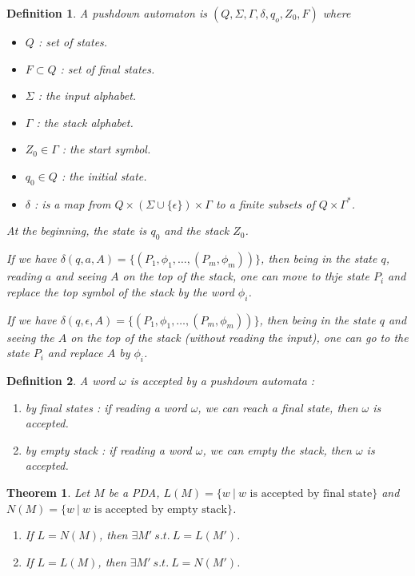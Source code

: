 \documentclass[a4paper,11pt]{article}
\newtheorem{mydef}{Definition}
\newtheorem{thm}{Theorem}[section]
\begin{document}
\begin{mydef}
  A pushdown automaton is $(Q,\Sigma,\Gamma,\delta,q_o,Z_0,F)$ where
  \begin{itemize}
  \item $Q$ : set of states.
  \item $F \subset Q$ : set of final states.
  \item $\Sigma$ : the input alphabet.
  \item $\Gamma$ : the stack alphabet.
  \item $Z_0 \in \Gamma$ : the start symbol.
  \item $q_0 \in Q$ : the initial state.
  \item $\delta$ : is a map from $Q \times (\Sigma \cup \{\epsilon\}) \times
    \Gamma$ to a finite subsets of $Q \times \Gamma^*$.
  \end{itemize}

  At the beginning, the state is $q_0$ and the stack $Z_0$.

  If we have $\delta(q,a,A) = \{(P_1,\phi_1,\dots,(P_m,\phi_m))\}$, then being
  in the state $q$, reading $a$ and seeing $A$ on the top of the stack, one can
  move to thje state $P_i$ and replace the top symbol of the stack by the word
  $\phi_i$.

  If we have $\delta(q,\epsilon,A) = \{(P_1,\phi_1,\dots,(P_m,\phi_m))\}$, then
  being in the state $q$ and seeing the $A$ on the top of the stack (without
  reading the input), one can go to the state $P_i$ and replace $A$ by $\phi_i$.
\end{mydef}

\begin{mydef}
  A word $\omega$ is accepted by a pushdown automata :
  \begin{enumerate}
  \item by final states : if reading a word $\omega$, we can reach a final
    state, then $\omega$ is accepted.
  \item by empty stack : if reading a word $\omega$, we can empty the stack,
    then $\omega$ is accepted.
  \end{enumerate}
\end{mydef}

\begin{thm}
  Let $M$ be a PDA, $L(M) = \{w\ |\ w \text{ is accepted by final state}\}$ and
  $N(M) = \{w\ |\ w \text{ is accepted by empty stack}\}$.
  \begin{enumerate}
  \item If $L = N(M)$, then $\exists M'\ s.t.\ L = L(M')$.
  \item If $L = L(M)$, then $\exists M'\ s.t.\ L = N(M')$.
  \end{enumerate}
\end{thm}
\end{document}
